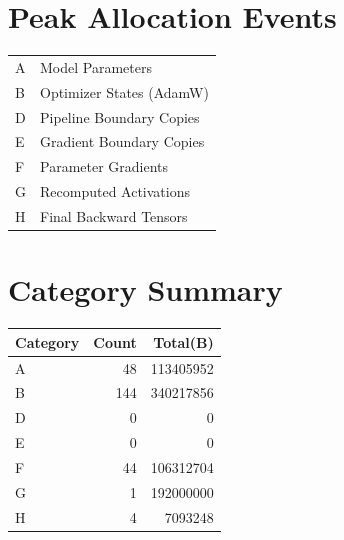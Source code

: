\documentclass{article}
\begin{document}
\section*{Peak Allocation Events}
\small
\begin{tabular}{ll}
A & Model Parameters \\
B & Optimizer States (AdamW) \\
D & Pipeline Boundary Copies \\
E & Gradient Boundary Copies \\
F & Parameter Gradients \\
G & Recomputed Activations \\
H & Final Backward Tensors \\
\end{tabular}
\vspace{0.5em}
\section*{Category Summary}
\begin{tabular}{l r r}
Category & Count & Total(B) \\
\hline
A & 48 & 113405952 \\
B & 144 & 340217856 \\
D & 0 & 0 \\
E & 0 & 0 \\
F & 44 & 106312704 \\
G & 1 & 192000000 \\
H & 4 & 7093248 \\
\end{tabular}
\vspace{0.5em}
\end{document}
